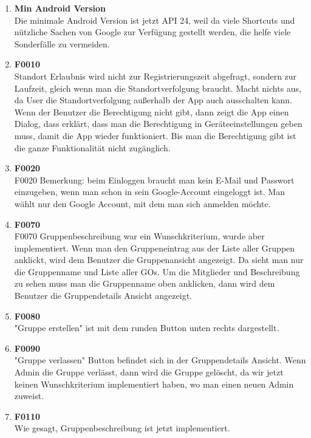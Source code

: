 \documentclass[11pt,a4paper]{scrartcl}
\begin{document}
\begin{enumerate}
	\item \textbf{Min Android Version} \\
	
	Die minimale Android Version ist jetzt API 24, weil da viele Shortcuts und nützliche Sachen von Google zur Verfügung gestellt werden, die helfe viele Sonderfälle zu vermeiden.	
	
	\item \textbf{F0010}\\Standort Erlaubnis wird nicht zur Registrierungszeit abgefragt, sondern zur Laufzeit, gleich wenn man die Standortverfolgung braucht. Macht nichts aus, da User die Standortverfolgung außerhalb der App auch ausschalten kann.
Wenn der Benutzer die Berechtigung nicht gibt, dann zeigt die App einen Dialog, dass erklärt, dass man die Berechtigung in Geräteeinstellungen geben muss, damit die App wieder funktioniert. Bis man die Berechtigung gibt ist die ganze Funktionalität nicht zugänglich.
\item \textbf{F0020}\\
F0020 Bemerkung: beim Einloggen braucht man kein E-Mail und Passwort einzugeben, wenn man schon in sein Google-Account eingeloggt ist. Man wählt nur den Google Account, mit dem man sich anmelden möchte.
\item \textbf{F0070}\\
F0070 Gruppenbeschreibung war ein Wunschkriterium, wurde aber implementiert.
Wenn man den Gruppeneintrag aus der Liste aller Gruppen anklickt, wird dem Benutzer die Gruppenansicht angezeigt. Da sieht man nur die Gruppenname und Liste aller GOs. Um die Mitglieder und Beschreibung zu sehen muss man die Gruppenname oben anklicken, dann wird dem Benutzer die Gruppendetails Ansicht angezeigt.

\item \textbf{F0080}\\ "Gruppe erstellen" ist mit dem runden Button unten rechts dargestellt.

\item \textbf{F0090}\\ "Gruppe verlassen" Button befindet sich in der Gruppendetails Ansicht. Wenn Admin die Gruppe verlässt, dann wird die Gruppe gelöscht, da wir jetzt keinen Wunschkriterium implementiert haben, wo man einen neuen Admin zuweist.

\item \textbf{F0110}\\ Wie gesagt, Gruppenbeschreibung ist jetzt implementiert.


\end{enumerate}
\end{document}
